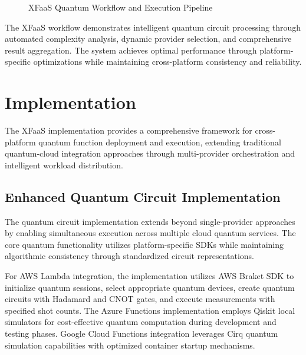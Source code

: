 \documentclass[onecolumn]{IEEEtran}
\begin{document}
\begin{figure}[ht]
{
}
\caption{XFaaS Quantum Workflow and Execution Pipeline}
\label{fig:xfaas_workflow}
\end{figure}

The XFaaS workflow demonstrates intelligent quantum circuit processing through automated complexity analysis, dynamic provider selection, and comprehensive result aggregation. The system achieves optimal performance through platform-specific optimizations while maintaining cross-platform consistency and reliability.

\section{Implementation}

The XFaaS implementation provides a comprehensive framework for cross-platform quantum function deployment and execution, extending traditional quantum-cloud integration approaches through multi-provider orchestration and intelligent workload distribution.

\subsection{Enhanced Quantum Circuit Implementation}

The quantum circuit implementation extends beyond single-provider approaches by enabling simultaneous execution across multiple cloud quantum services. The core quantum functionality utilizes platform-specific SDKs while maintaining algorithmic consistency through standardized circuit representations.

For AWS Lambda integration, the implementation utilizes AWS Braket SDK to initialize quantum sessions, select appropriate quantum devices, create quantum circuits with Hadamard and CNOT gates, and execute measurements with specified shot counts. The Azure Functions implementation employs Qiskit local simulators for cost-effective quantum computation during development and testing phases. Google Cloud Functions integration leverages Cirq quantum simulation capabilities with optimized container startup mechanisms.
\end{document}
